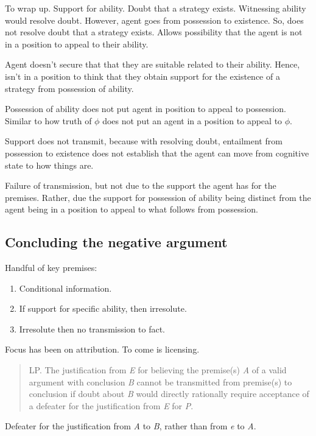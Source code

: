 \documentclass[10pt]{article}
\newcommand{\hozline}[0]{%
  \noindent\hdashrule[0.5ex][c]{\textwidth}{.1pt}{}
}
\begin{document}
\begin{note}
  To wrap up.
  Support for ability.
  Doubt that a strategy exists.
  Witnessing ability would resolve doubt.
  However, agent goes from possession to existence.
  So, does not resolve doubt that a strategy exists.
  Allows possibility that the agent is not in a position to appeal to their ability.

  Agent doesn't secure that that they are suitable related to their ability.
  Hence, isn't in a position to think that they obtain support for the existence of a strategy from possession of ability.

  Possession of ability does not put agent in position to appeal to possession.
  Similar to how truth of \(\phi\) does not put an agent in a position to appeal to \(\phi\).

  Support does not transmit, because with resolving doubt, entailment from possession to existence does not establish that the agent can move from cognitive state to how things are.

  Failure of transmission, but not due to the support the agent has for the premises.
  Rather, due the support for possession of ability being distinct from the agent being in a position to appeal to what follows from possession.
\end{note}

\subsection{Concluding the negative argument}
\label{sec:concl-negat-argum}

\begin{note}
  Handful of key premises:
  \begin{enumerate}
  \item Conditional information.
  \item If support for specific ability, then irresolute.
  \item Irresolute then no transmission to fact.
  \end{enumerate}
\end{note}

\begin{note}
  Focus has been on attribution.
  To come is licensing.
\end{note}


\hozline

\newpage

\begin{note}[Davies]
  \begin{quote}
    LP. The justification from \emph{E} for believing the premise(s) \emph{A} of a valid argument with conclusion \emph{B} cannot be transmitted from premise(s) to conclusion if doubt about \emph{B} would directly rationally require acceptance of a defeater for the justification from \emph{E} for \emph{P}.
  \end{quote}
  Defeater for the justification from \emph{A} to \emph{B}, rather than from \emph{e} to \emph{A}.
\end{note}
\end{document}
